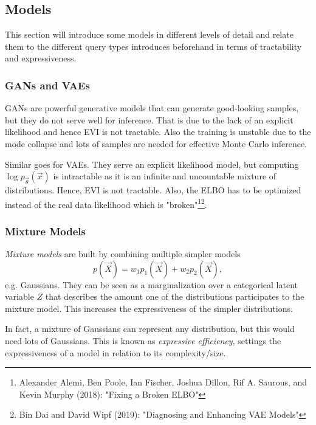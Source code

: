 		\subsection{Models}
			This section will introduce some models in different levels of detail and relate them to the different query types introduces beforehand in terms of tractability and expressiveness.

			\subsubsection{GANs and VAEs}
				GANs are powerful generative models that can generate good-looking samples, but they do not serve well for inference. That is due to the lack of an explicit likelihood and hence EVI is not tractable. Also the training is unstable due to the mode collapse and lots of samples are needed for effective Monte Carlo inference.

				Similar goes for VAEs. They serve an explicit likelihood model, but computing \( \log p_{\vec{\theta}}(\vec{x}) \) is intractable as it is an infinite and uncountable mixture of distributions. Hence, EVI is not tractable. Also, the ELBO has to be optimized instead of the real data likelihood which is "broken"\footnote{Alexander Alemi, Ben Poole, Ian Fischer, Joshua Dillon, Rif A. Saurous, and Kevin Murphy (2018): "Fixing a Broken ELBO"}\footnote{Bin Dai and David Wipf (2019): "Diagnosing and Enhancing VAE Models"}.

			\subsubsection{Mixture Models}
				\emph{Mixture models} are built by combining multiple simpler models
				\begin{equation}
					p(\vec{X}) = w_1 p_1(\vec{X}) + w_2 p_2(\vec{X}),
				\end{equation}
				e.g. Gaussians. They can be seen as a marginalization over a categorical latent variable \(Z\) that describes the amount one of the distributions participates to the mixture model. This increases the expressiveness of the simpler distributions.

				In fact, a mixture of Gaussians can represent any distribution, but this would need lots of Gaussians. This is known as \emph{expressive efficiency}, settings the expressiveness of a model in relation to its complexity/size.

